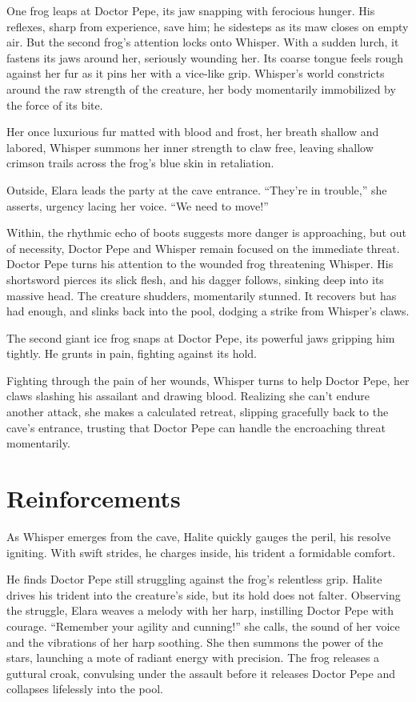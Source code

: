 \documentclass[
  letterpaper,12pt,twoside,twocolumn,openany,
  nodeprecatedcode,bg=full]{dndbook}
\begin{document}
One frog leaps at Doctor Pepe, its jaw snapping with ferocious hunger.
His reflexes, sharp from experience, save him; he sidesteps as its maw
closes on empty air. But the second frog's attention locks onto Whisper.
With a sudden lurch, it fastens its jaws around her, seriously wounding
her. Its coarse tongue feels rough against her fur as it pins her with a
vice-like grip. Whisper's world constricts around the raw strength of
the creature, her body momentarily immobilized by the force of its bite.

Her once luxurious fur matted with blood and frost, her breath shallow
and labored, Whisper summons her inner strength to claw free, leaving
shallow crimson trails across the frog's blue skin in retaliation.

Outside, Elara leads the party at the cave entrance. ``They're in
trouble,'' she asserts, urgency lacing her voice. ``We need to move!''

Within, the rhythmic echo of boots suggests more danger is approaching,
but out of necessity, Doctor Pepe and Whisper remain focused on the
immediate threat. Doctor Pepe turns his attention to the wounded frog
threatening Whisper. His shortsword pierces its slick flesh, and his
dagger follows, sinking deep into its massive head. The creature
shudders, momentarily stunned. It recovers but has had enough, and
slinks back into the pool, dodging a strike from Whisper's claws.

The second giant ice frog snaps at Doctor Pepe, its powerful jaws
gripping him tightly. He grunts in pain, fighting against its hold.

Fighting through the pain of her wounds, Whisper turns to help Doctor
Pepe, her claws slashing his assailant and drawing blood. Realizing she
can't endure another attack, she makes a calculated retreat, slipping
gracefully back to the cave's entrance, trusting that Doctor Pepe can
handle the encroaching threat momentarily.

\section{Reinforcements}\label{reinforcements}

As Whisper emerges from the cave, Halite quickly gauges the peril, his
resolve igniting. With swift strides, he charges inside, his trident a
formidable comfort.

He finds Doctor Pepe still struggling against the frog's relentless
grip. Halite drives his trident into the creature's side, but its hold
does not falter. Observing the struggle, Elara weaves a melody with her
harp, instilling Doctor Pepe with courage. ``Remember your agility and
cunning!'' she calls, the sound of her voice and the vibrations of her
harp soothing. She then summons the power of the stars, launching a mote
of radiant energy with precision. The frog releases a guttural croak,
convulsing under the assault before it releases Doctor Pepe and
collapses lifelessly into the pool.
\end{document}
